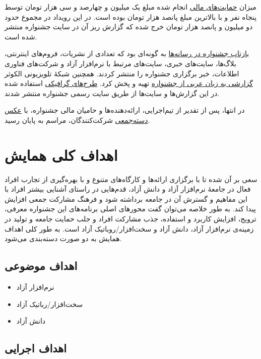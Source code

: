 \documentclass{article}
\begin{document}
{{میزان \href{http://sfd.fsug.ir/1394/patronage/donation}{حمایت‌های مالی} انجام شده مبلغ یک میلیون و چهارصد و سی هزار تومان توسط پنجاه نفر و با بالاترین مبلغ پانصد هزار تومان بوده است. در این رویداد در مجموع حدود دو میلیون و پانصد هزار تومان خرج شده که گزارش ریز آن در سایت جشنواره منتشر شده است.

\href{http://sfd.fsug.ir/1394/in-media}{بازتاب جشنواره در رسانه‌ها} به گونه‌ای بود که تعدادی از نشریات، فروم‌های اینترنتی، بلاگ‌ها، سایت‌های خبری، سایت‌های مرتبط با نرم‌افزار آزاد و شرکت‌های فناوری اطلاعات، خبر برگزاری جشنواره را منتشر کردند. همچنین شبکهٔ تلویزیونی الکوثر \href{https://www.youtube.com/watch?v=pT-4Gc1Z4LQ}{گزارشی به زبان عربی از جشنواره} تهیه و پخش کرد. \href{http://sfd.fsug.ir/1394/artworks}{طرح‌های گرافیکی} استفاده شده در این گزارش‌ها و سایت‌ها از طریق سایت رسمی جشنواره منتشر شدند.

در انتها، پس از تقدیر از تیم‌اجرایی، ارائه‌دهنده‌ها و حامیان مالی جشنواره، با \href{http://sfd.fsug.ir/1394/photos}{عکس دسته‌جمعی} شرکت‌کنندگان، مراسم به پایان رسید.

\section{اهداف کلی همایش}
سعی بر آن شده تا با برگزاری ارائه‌ها و کارگاه‌های متنوع و با بهره‌گیری از تجارب افراد فعال در جامعهٔ نرم‌افزار آزاد و دانش آزاد، قدم‌هایی در راستای آشنایی بیشتر افراد با این مفاهیم و گسترش آن در جامعه برداشته شود و فرهنگ مشارکت جمعی افزایش پیدا کند. به طور خلاصه می‌توان گفت محورهای اصلی برنامه‌های این جشنواره معرفی، ترویج، افزایش کاربرد و استفاده، جذب مشارکت افراد و جلب حمایت جامعه و تولید در زمینه‌ی نرم‌افزار آزاد، دانش آزاد و سخت‌افزار/روباتیک آزاد است. به طور کلی اهداف همایش به دو صورت دسته‌بندی می‌شود.

\subsection{اهداف موضوعی}
\begin{flushright}

\begin{itemize}
\item نرم‌افزار آزاد
\item سخت‌افزار/رباتیک آزاد
\item دانش آزاد
\end{itemize}
\end{flushright}

\subsection{اهداف اجرایی}

}}
\end{document}
